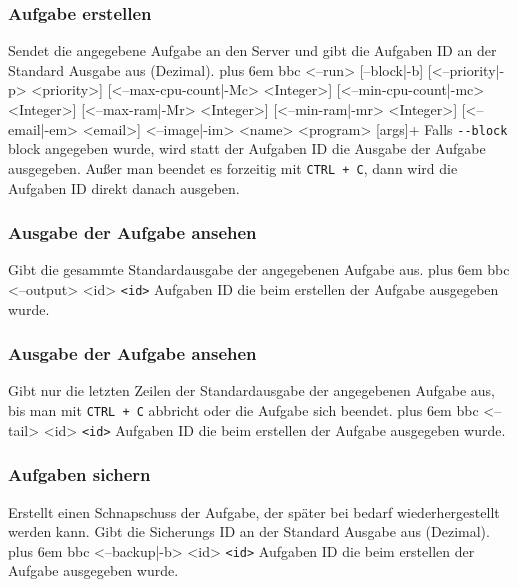 \documentclass[a4paper,12pt]{article}
\makeatletter
\newenvironment{mycode}
 {\def\@xobeysp{\ }\verbatim\rightskip=0pt plus 6em\relax}
 {\endverbatim}
\makeatother
\begin{document}
\subsubsection{Aufgabe erstellen}
Sendet die angegebene Aufgabe an den Server und gibt die Aufgaben ID an der Standard Ausgabe aus (Dezimal).
\begin{mycode}
bbc <--run> [--block|-b] [<--priority|-p> <priority>] [<--max-cpu-count|-Mc> <Integer>] [<--min-cpu-count|-mc> <Integer>] [<--max-ram|-Mr> <Integer>] [<--min-ram|-mr> <Integer>] [<--email|-em> <email>] <--image|-im> <name> <program> [args]+
\end{mycode}
Falls \texttt{-{}-block} block angegeben wurde, wird statt der Aufgaben ID die Ausgabe der Aufgabe ausgegeben.
Außer man beendet es forzeitig mit \texttt{CTRL + C}, dann wird die Aufgaben ID direkt danach ausgeben.

\subsubsection{Ausgabe der Aufgabe ansehen}
Gibt die gesammte Standardausgabe der angegebenen Aufgabe aus.
\begin{mycode}
bbc <--output> <id>
\end{mycode}
\texttt{<id>} Aufgaben ID die beim erstellen der Aufgabe ausgegeben wurde.

\subsubsection{Ausgabe der Aufgabe ansehen}
Gibt nur die letzten Zeilen der Standardausgabe der angegebenen Aufgabe aus, bis man mit \texttt{CTRL + C} abbricht oder die Aufgabe sich beendet.
\begin{mycode}
bbc <--tail> <id>
\end{mycode}
\texttt{<id>} Aufgaben ID die beim erstellen der Aufgabe ausgegeben wurde.

\subsubsection{Aufgaben sichern}
Erstellt einen Schnapschuss der Aufgabe, der später bei bedarf wiederhergestellt werden kann.
Gibt die Sicherungs ID an der Standard Ausgabe aus (Dezimal).
\begin{mycode}
bbc <--backup|-b> <id>
\end{mycode}
\texttt{<id>} Aufgaben ID die beim erstellen der Aufgabe ausgegeben wurde.
\end{document}

